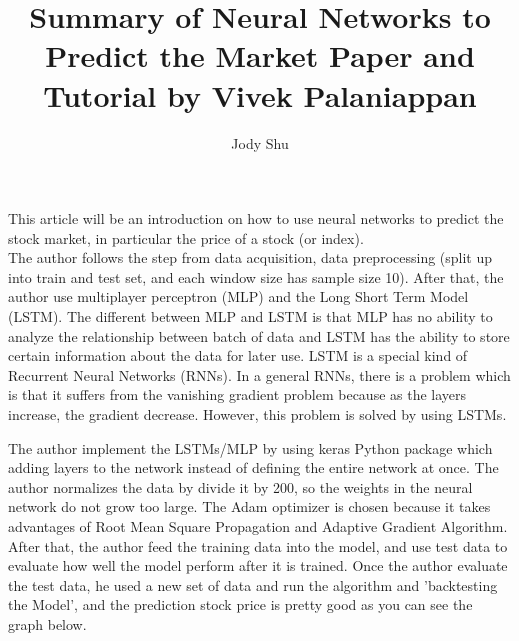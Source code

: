 \documentclass[11pt, oneside]{article}   	%
\title{Summary of Neural Networks to Predict the Market Paper and Tutorial by Vivek Palaniappan}
\author{Jody Shu}
\begin{document}
\begin{Large}
\maketitle

This article will be an introduction on how to use neural networks to predict the stock market, in particular the price of a stock (or index).  \\

The author follows the step from data acquisition, data preprocessing (split up into train and test set, and each window size has sample size 10).  After that, the author use multiplayer perceptron (MLP) and the Long Short Term Model (LSTM).  The different between MLP and LSTM is that MLP has no ability to analyze the relationship between batch of data and LSTM has the ability to store certain information about the data for later use.  LSTM is a special kind of Recurrent Neural Networks (RNNs).  In a general RNNs, there is a problem which is that it suffers from the vanishing gradient problem because as the layers increase, the gradient decrease.  However, this problem is solved by using LSTMs.

The author implement the LSTMs/MLP by using keras Python package which adding layers to the network instead of defining the entire network at once.  The author normalizes the data by divide it by 200, so the weights in the neural network do not grow too large.  The Adam optimizer is chosen because it takes advantages of Root Mean Square Propagation and Adaptive Gradient Algorithm.  After that, the author feed the training data into the model, and use test data to evaluate how well the model perform after it is trained.  Once the author evaluate the test data, he used a new set of data and run the algorithm and 'backtesting the Model', and the prediction stock price is pretty good as you can see the graph below.  


\end{Large}
\end{document}
